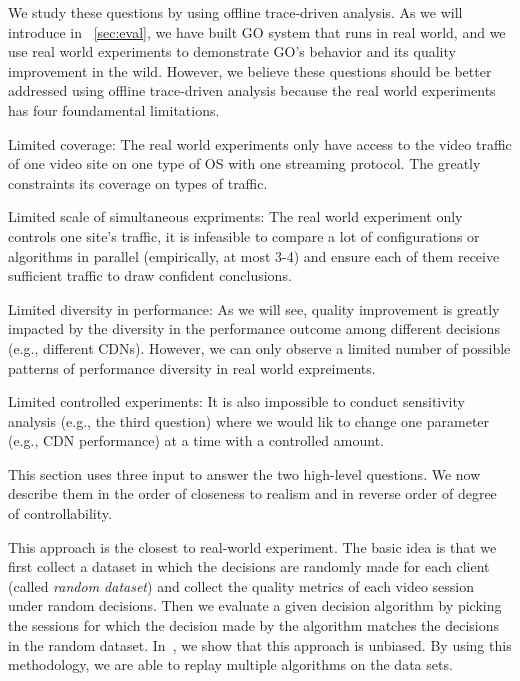 We study these questions by using offline trace-driven analysis. As we will introduce in \Section~\ref{sec:eval}, we have built GO system that runs in real world, and we use real world experiments to demonstrate GO's behavior and its quality improvement in the wild. However, we believe these questions should be better addressed using offline trace-driven analysis because the real world experiments has four foundamental limitations.
\begin{packedenumerate}
	\item Limited coverage: The real world experiments only have access to the video traffic of one video site on one type of OS with one streaming protocol. The greatly constraints its coverage on types of traffic.
	\item Limited scale of simultaneous expriments: The real world experiment only controls one site's traffic, it is infeasible to compare a lot of configurations or algorithms in parallel (empirically, at most 3-4) and ensure each of them receive sufficient traffic to draw confident conclusions.
	\item Limited diversity in performance: As we will see, quality improvement is greatly impacted by the diversity in the performance outcome among different decisions (e.g., different CDNs). However, we can only observe a limited number of possible patterns of performance diversity in real world expreiments.
	\item Limited controlled experiments: It is also impossible to conduct sensitivity analysis (e.g., the third question) where we would lik to change one parameter (e.g., CDN performance) at a time with a controlled amount.
\end{packedenumerate}


This section uses three input to answer the two high-level questions. We now describe them in the order of closeness to realism and in reverse order of degree of controllability.

 This approach is the closest to real-world experiment. The basic idea is that we first collect a dataset in which the decisions are randomly made for each client (called {\it random dataset}) and collect the quality metrics of each video session under random decisions. Then we evaluate a given decision algorithm by picking the sessions for which the decision made by the algorithm matches the decisions in the random dataset. In~\cite{technicalreport}, we show that this approach is unbiased. 
By using this methodology, we are able to replay multiple algorithms on the data sets.

